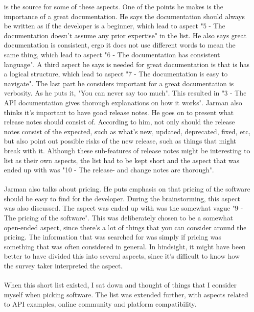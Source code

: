 \documentclass{cslthse-msc}
\begin{document}
    \citet{jarman} is the source for some of these
    aspects. One of the points he makes is the importance of a great documentation.
    He says the documentation should always be written as if the developer is
    a beginner, which lead to aspect "5 - The documentation doesn't assume any prior expertise" in the list.
    He also says great documentation is consistent, ergo it does not use different
    words to mean the same thing, which lead to aspect "6 - The documentation has consistent language".
    A third aspect he says is needed for great documentation is that is has a
    logical structure, which lead to aspect "7 - The documentation is easy to navigate".
    The last part he considers important for a great documentation is verbosity.
    As he puts it, "You can never say too much". This resulted in "3 - The API documentation gives thorough explanations on how it works".
    Jarman also thinks it's important to have good release notes. He goes on
    to present what release notes should consist of. According to him, not
    only should the release notes consist of the expected, such as what's new,
    updated, deprecated, fixed, etc, but also point out possible risks of the new release,
    such as things that might break with it. Although these sub-features of release notes
    might be interesting to list as their own aspects, the list had to be kept short
    and the aspect that was ended up with was "10 - The release- and change notes are thorough".
    \\ \\
    Jarman also talks about pricing. He puts emphasis on that pricing of the software
    should be easy to find for the developer. During the brainstorming, this
    aspect was also discussed. The aspect was ended up with was the somewhat vague
    "9 - The pricing of the software". This was deliberately chosen
    to be a somewhat open-ended aspect, since there's a lot of things that you can
    consider around the pricing. The information that was searched for was simply if pricing was something
    that was often considered in general. In hindsight, it might have been better to have
    divided this into several aspects, since it's difficult to know how the
    survey taker interpreted the aspect.
    \\ \\
    When this short list existed, I sat down and thought of things that I
    consider myself when picking software. The list was extended further,
    with aspects related to API examples, online community and  platform compatibility.
\end{document}
